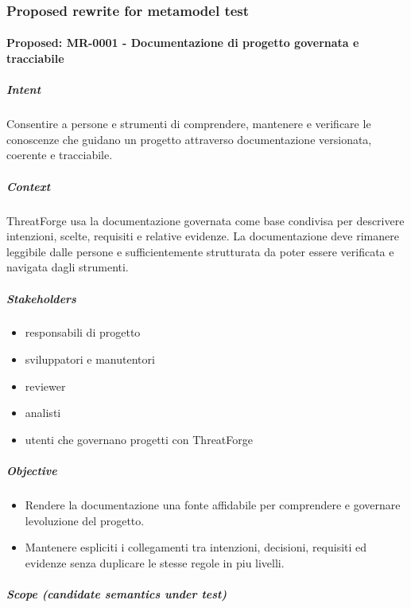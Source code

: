 \documentclass[
  10pt,
]{article}
\providecommand{\tightlist}{%
  \setlength{\itemsep}{0pt}\setlength{\parskip}{0pt}}
\begin{document}
\subsubsection{Proposed rewrite for metamodel
test}\label{proposed-rewrite-for-metamodel-test}

\paragraph{Proposed: MR-0001 - Documentazione di progetto governata e
tracciabile}\label{proposed-mr-0001---documentazione-di-progetto-governata-e-tracciabile}

\subparagraph{Intent}\label{intent-1}

Consentire a persone e strumenti di comprendere, mantenere e verificare
le conoscenze che guidano un progetto attraverso documentazione
versionata, coerente e tracciabile.

\subparagraph{Context}\label{context-1}

ThreatForge usa la documentazione governata come base condivisa per
descrivere intenzioni, scelte, requisiti e relative evidenze. La
documentazione deve rimanere leggibile dalle persone e sufficientemente
strutturata da poter essere verificata e navigata dagli strumenti.

\subparagraph{Stakeholders}\label{stakeholders}

\begin{itemize}
\tightlist
\item
  responsabili di progetto
\item
  sviluppatori e manutentori
\item
  reviewer
\item
  analisti
\item
  utenti che governano progetti con ThreatForge
\end{itemize}

\subparagraph{Objective}\label{objective}

\begin{itemize}
\tightlist
\item
  Rendere la documentazione una fonte affidabile per comprendere e
  governare l\textquotesingle evoluzione del progetto.
\item
  Mantenere espliciti i collegamenti tra intenzioni, decisioni,
  requisiti ed evidenze senza duplicare le stesse regole in piu livelli.
\end{itemize}

\subparagraph{Scope (candidate semantics under
test)}\label{scope-candidate-semantics-under-test}
\end{document}

